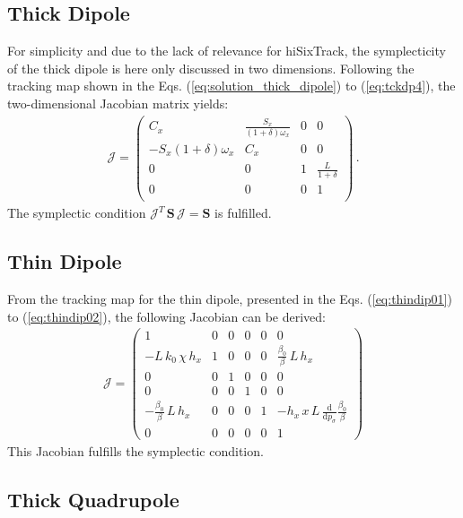\subsection{Thick Dipole}
For simplicity and due to the lack of relevance for hiSixTrack, the symplecticity of the thick dipole is here only discussed in two dimensions. Following the tracking map shown in the Eqs. (\ref{eq:solution_thick_dipole}) to (\ref{eq:tckdp4}), the two-dimensional Jacobian matrix yields: 
\begin{align}
\mathcal{J} = 
\left(
\begin{array}{cccc}
 C_x & \frac{S_x}{(1+\delta) \omega_x } & 0 & 0 \\
 -S_x (1+\delta) \omega_x  & C_x & 0 & 0 \\
 0 & 0 & 1 & \frac{L}{1+\delta} \\
 0 & 0 & 0 & 1 \\
\end{array}
\right) \, .
\end{align}
%
The symplectic condition $\mathcal{J}^T \, \mathbf{S} \, \mathcal{J} = \mathbf{S}$ is fulfilled.


\subsection{Thin Dipole}

From the tracking map for the thin dipole, presented in the Eqs. (\ref{eq:thindip01}) to (\ref{eq:thindip02}), the following Jacobian can be derived:
\begin{align}
  \mathcal{J} = 
\begin{pmatrix} 1 & 0 & 0 & 0 & 0 & 0 \\ -L \, k_0 \, \chi \, h_x & 1 & 0 & 0 & 0 & \frac{\beta_0}{\beta} \, L \, h_x \\ 0 & 0 & 1 & 0 & 0 & 0 \\ 0 & 0 & 0 & 1 & 0 & 0 \\ -\frac{\beta_0}{\beta} \,  L \, h_x & 0 & 0 & 0 & 1 & -h_x \, x \, L \, \frac{\mathrm{d}}{\mathrm{d} p_\sigma} \frac{\beta_0}{\beta} \\ 0 & 0 & 0 & 0 & 0 & 1   \end{pmatrix}
\end{align}
This Jacobian fulfills the symplectic condition.

\subsection{Thick Quadrupole}

